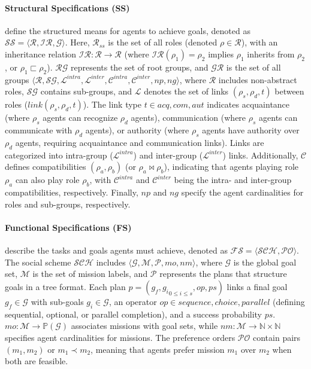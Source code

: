 \documentclass[sigconf,anonymous]{aamas}
\begin{document}
\noindent \paragraph{\textbf{Structural Specifications (SS)}} define the structured means for agents to achieve goals, denoted as $\mathcal{SS} = \langle \mathcal{R}, \mathcal{IR}, \mathcal{G} \rangle$. Here, $\mathcal{R}_{ss}$ is the set of all roles (denoted $\rho \in \mathcal{R}$), with an inheritance relation $\mathcal{IR}: \mathcal{R} \rightarrow \mathcal{R}$ (where $\mathcal{IR}(\rho_1) = \rho_2$ implies $\rho_1$ inherits from $\rho_2$, or $\rho_1 \sqsubset \rho_2$). $\mathcal{RG}$ represents the set of root groups, and $\mathcal{GR}$ is the set of all groups $\langle \mathcal{R}, \mathcal{SG}, \mathcal{L}^{intra}, \mathcal{L}^{inter}, \mathcal{C}^{intra}, \mathcal{C}^{inter}, np, ng \rangle$, where $\mathcal{R}$ includes non-abstract roles, $\mathcal{SG}$ contains sub-groups, and $\mathcal{L}$ denotes the set of links $(\rho_s,\rho_d,t)$ between roles ($link(\rho_s,\rho_d,t)$). The link type $t \in {acq, com, aut}$ indicates acquaintance (where $\rho_s$ agents can recognize $\rho_d$ agents), communication (where $\rho_s$ agents can communicate with $\rho_d$ agents), or authority (where $\rho_s$ agents have authority over $\rho_d$ agents, requiring acquaintance and communication links). Links are categorized into intra-group ($\mathcal{L}^{intra}$) and inter-group ($\mathcal{L}^{inter}$) links. Additionally, $\mathcal{C}$ defines compatibilities $(\rho_a, \rho_b)$ (or $\rho_a \bowtie \rho_b$), indicating that agents playing role $\rho_a$ can also play role $\rho_b$, with $\mathcal{C}^{intra}$ and $\mathcal{C}^{inter}$ being the intra- and inter-group compatibilities, respectively. Finally, $np$ and $ng$ specify the agent cardinalities for roles and sub-groups, respectively.

\noindent \paragraph{\textbf{Functional Specifications (FS)}} describe the tasks and goals agents must achieve, denoted as $\mathcal{FS} = \langle \mathcal{SCH}, \mathcal{PO} \rangle$. The social scheme $\mathcal{SCH}$ includes $\langle\mathcal{G}, \mathcal{M}, \mathcal{P}, mo, nm \rangle$, where $\mathcal{G}$ is the global goal set, $\mathcal{M}$ is the set of mission labels, and $\mathcal{P}$ represents the plans that structure goals in a tree format. Each plan $p = (g_f, {g_i}_{0 \leq i \leq s}, op, ps)$ links a final goal $g_f \in \mathcal{G}$ with sub-goals $g_i \in \mathcal{G}$, an operator $op \in {sequence, choice, parallel}$ (defining sequential, optional, or parallel completion), and a success probability $ps$. $mo: \mathcal{M} \rightarrow \mathbb{P}(\mathcal{G})$ associates missions with goal sets, while $nm: \mathcal{M} \rightarrow \mathbb{N} \times \mathbb{N}$ specifies agent cardinalities for missions. The preference orders $\mathcal{PO}$ contain pairs $(m_1, m_2)$ or $m_1 \prec m_2$, meaning that agents prefer mission $m_1$ over $m_2$ when both are feasible.
\end{document}
